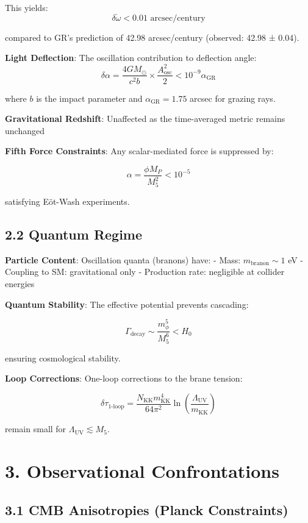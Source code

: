 \documentclass[
  11pt,
]{report}
\begin{document}
This yields: \[\delta\dot{\omega} < 0.01 \text{ arcsec/century}\]

compared to GR's prediction of 42.98 arcsec/century (observed: 42.98 ±
0.04).

\textbf{Light Deflection}: The oscillation contribution to deflection
angle:
\[\delta\alpha = \frac{4GM_\odot}{c^2 b} \times \frac{A_\text{osc}^2}{2} < 10^{-9} \alpha_\text{GR}\]

where \(b\) is the impact parameter and \(\alpha_\text{GR} = 1.75\)
arcsec for grazing rays.

\textbf{Gravitational Redshift}: Unaffected as the time-averaged metric
remains unchanged

\textbf{Fifth Force Constraints}: Any scalar-mediated force is
suppressed by:

\[\alpha = \frac{\phi M_P}{M_5^2} < 10^{-5}\]

satisfying Eöt-Wash experiments.

\subsection{2.2 Quantum Regime}\label{quantum-regime}

\textbf{Particle Content}: Oscillation quanta (branons) have: - Mass:
\(m_\text{branon} \sim 1\) eV - Coupling to SM: gravitational only -
Production rate: negligible at collider energies

\textbf{Quantum Stability}: The effective potential prevents cascading:

\[\Gamma_\text{decay} \sim \frac{m_\phi^5}{M_5^6} < H_0\]

ensuring cosmological stability.

\textbf{Loop Corrections}: One-loop corrections to the brane tension:

\[\delta\tau_\text{1-loop} = \frac{N_\text{KK} m_\text{KK}^4}{64\pi^2} \ln\left(\frac{\Lambda_\text{UV}}{m_\text{KK}}\right)\]

remain small for \(\Lambda_\text{UV} \lesssim M_5\).

\section{3. Observational
Confrontations}\label{observational-confrontations}

\subsection{3.1 CMB Anisotropies (Planck
Constraints)}\label{cmb-anisotropies-planck-constraints}
\end{document}
